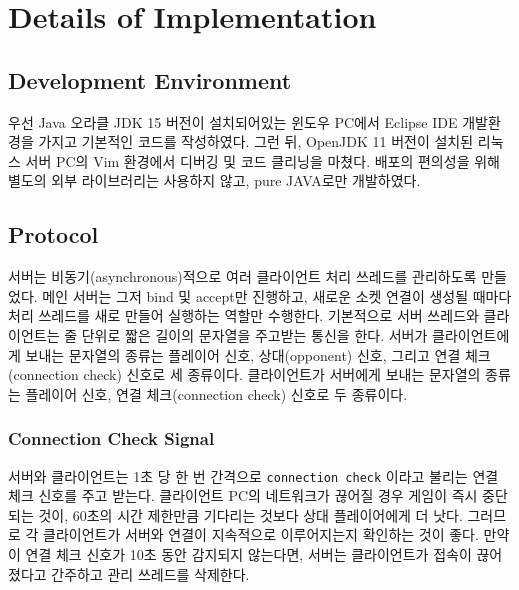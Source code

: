 \documentclass[a4paper, 10pt]{article}
\begin{document}
\section{Details of Implementation}
\subsection{Development Environment}
우선 Java 오라클 JDK 15 버전이 설치되어있는 윈도우 PC에서 Eclipse IDE
개발환경을 가지고 기본적인 코드를 작성하였다. 그런 뒤, OpenJDK 11 버전이
설치된 리눅스 서버 PC의 Vim 환경에서 디버깅 및 코드 클리닝을 마쳤다.
배포의 편의성을 위해 별도의 외부 라이브러리는 사용하지 않고, pure JAVA로만
개발하였다.

\subsection{Protocol}
서버는 비동기(asynchronous)적으로 여러 클라이언트 처리 쓰레드를 관리하도록
만들었다. 메인 서버는 그저 bind 및 accept만 진행하고, 새로운 소켓 연결이
생성될 때마다 처리 쓰레드를 새로 만들어 실행하는 역할만 수행한다.
기본적으로 서버 쓰레드와 클라이언트는 줄 단위로 짧은 길이의 문자열을 주고받는
통신을 한다. 서버가 클라이언트에게 보내는 문자열의 종류는 플레이어 신호,
상대(opponent) 신호, 그리고 연결 체크(connection check) 신호로 세 종류이다.
클라이언트가 서버에게 보내는 문자열의 종류는 플레이어 신호, 연결 체크(connection
check) 신호로 두 종류이다.

\subsubsection{Connection Check Signal}
서버와 클라이언트는 1초 당 한 번 간격으로 \texttt{connection check}
이라고 불리는 연결 체크 신호를 주고 받는다. 클라이언트 PC의 네트워크가
끊어질 경우 게임이 즉시 중단되는 것이, 60초의 시간 제한만큼 기다리는 것보다
상대 플레이어에게 더 낫다. 그러므로 각 클라이언트가 서버와 연결이 지속적으로
이루어지는지 확인하는 것이 좋다. 만약 이 연결 체크 신호가 10초 동안 감지되지
않는다면, 서버는 클라이언트가 접속이 끊어졌다고 간주하고 관리 쓰레드를 삭제한다.
\end{document}
